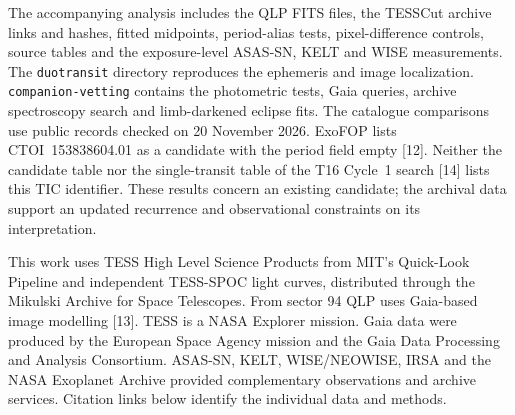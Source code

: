 \documentclass[11pt,a4paper]{article}
\newcommand{\Sec}[2]{\par\vspace{9pt}\noindent{\large\bfseries\sffamily\color{accent}#1\quad #2}\par\nobreak\vspace{3pt}\noindent\ignorespaces}
\begin{document}
\clearpage
\Sec{}{Data, software and references}
The accompanying analysis includes the QLP FITS files, the TESSCut archive links and hashes, fitted midpoints, period-alias tests, pixel-difference controls, source tables and the exposure-level ASAS-SN, KELT and WISE measurements. The \texttt{duotransit} directory reproduces the ephemeris and image localization. \texttt{companion-vetting} contains the photometric tests, Gaia queries, archive spectroscopy search and limb-darkened eclipse fits. The catalogue comparisons use public records checked on 20 November 2026. ExoFOP lists CTOI~153838604.01 as a candidate with the period field empty [12]. Neither the candidate table nor the single-transit table of the T16 Cycle~1 search [14] lists this TIC identifier. These results concern an existing candidate; the archival data support an updated recurrence and observational constraints on its interpretation.
\par This work uses TESS High Level Science Products from MIT's Quick-Look Pipeline and independent TESS-SPOC light curves, distributed through the Mikulski Archive for Space Telescopes. From sector 94 QLP uses Gaia-based image modelling [13]. TESS is a NASA Explorer mission. Gaia data were produced by the European Space Agency mission and the Gaia Data Processing and Analysis Consortium. ASAS-SN, KELT, WISE/NEOWISE, IRSA and the NASA Exoplanet Archive provided complementary observations and archive services. Citation links below identify the individual data and methods.
\vspace{9pt}
\end{document}
